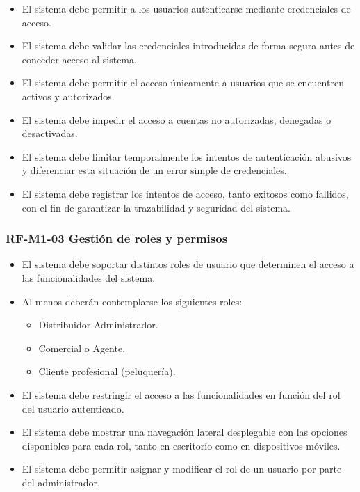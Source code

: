 \begin{itemize}
    \item El sistema debe permitir a los usuarios autenticarse mediante credenciales de acceso.
    \item El sistema debe validar las credenciales introducidas de forma segura antes de conceder acceso al sistema.
    \item El sistema debe permitir el acceso únicamente a usuarios que se encuentren activos y autorizados.
    \item El sistema debe impedir el acceso a cuentas no autorizadas, denegadas o desactivadas.
    \item El sistema debe limitar temporalmente los intentos de autenticación abusivos y diferenciar esta situación de un error simple de credenciales.
    \item El sistema debe registrar los intentos de acceso, tanto exitosos como fallidos, con el fin de garantizar la trazabilidad y seguridad del sistema.
\end{itemize}

\vspace{-0.75em}
\subsubsection{RF-M1-03 Gestión de roles y permisos}
\vspace{-1em}

\begin{itemize}
    \item El sistema debe soportar distintos roles de usuario que determinen el acceso a las funcionalidades del sistema.
    \item Al menos deberán contemplarse los siguientes roles:
          \begin{itemize}
              \item Distribuidor Administrador.
              \item Comercial o Agente.
              \item Cliente profesional (peluquería).
          \end{itemize}
    \item El sistema debe restringir el acceso a las funcionalidades en función del rol del usuario autenticado.
    \item El sistema debe mostrar una navegación lateral desplegable con las opciones disponibles para cada rol, tanto en escritorio como en dispositivos móviles.
    \item El sistema debe permitir asignar y modificar el rol de un usuario por parte del administrador.
\end{itemize}

